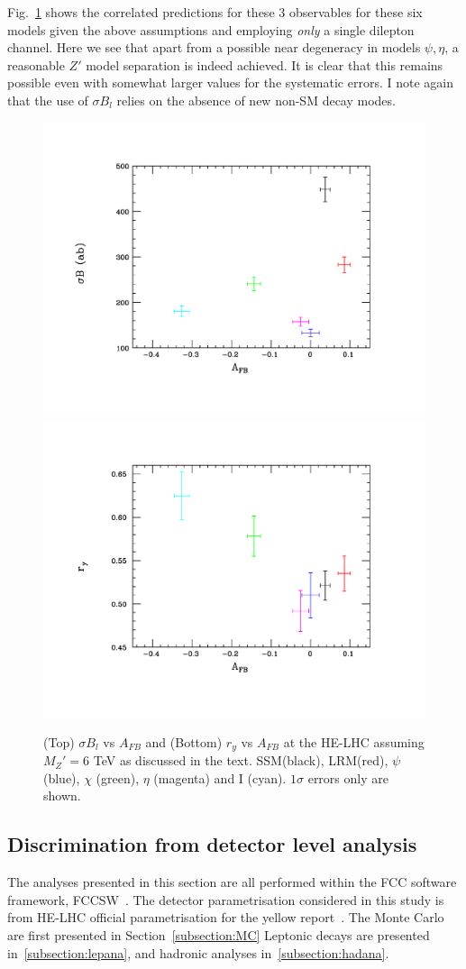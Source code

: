Fig.~\ref{toy3} shows the correlated predictions for these 3 observables for these six models given the above assumptions and employing {\it only} a single dilepton 
channel. Here we see that apart from a possible near degeneracy in models $\psi,\eta$, a reasonable $Z'$ model separation is indeed achieved. It is clear that this 
remains possible even with somewhat larger values for the systematic errors. I note again that the use of $\sigma B_l$ relies on the absence of new non-SM decay 
modes.



\begin{figure}[htbp]
  \centering
\includegraphics[trim={2cm 2cm 2cm 2cm},clip,width=0.49\columnwidth]{Fig/compare2.pdf}
\includegraphics[trim={2cm 2cm 2cm 2cm},clip,width=0.49\columnwidth]{Fig/compare3.pdf}
\caption{(Top) $\sigma B_l$ vs $A_{FB}$ and (Bottom) $r_y$ vs $A_{FB}$ at the HE-LHC assuming $M_Z'=6$ TeV as discussed in the text. 
SSM(black), LRM(red), $\psi$ (blue), $\chi$ (green), $\eta$ (magenta) and I (cyan). $1\sigma$ errors only are shown. }
\label{toy3}
\end{figure}




\subsection{Discrimination from detector level analysis}
The analyses presented in this section are all performed within the FCC software framework, FCCSW~\cite{fccsw}.
The detector parametrisation considered in this study is from HE-LHC official parametrisation for the yellow report~\cite{HELHCtwiki}.
The Monte Carlo are first presented in Section~\ref{subsection:MC} Leptonic decays are presented in~\ref{subsection:lepana}, and hadronic analyses in~\ref{subsection:hadana}.


